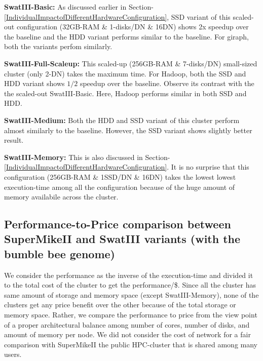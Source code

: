 \documentclass[conference]{IEEEtran}
\begin{document}
\begin{inparaenum}[\itshape 1\upshape)]
\item \textbf{SwatIII-Basic:} As discussed earlier in Section-\ref{IndividualImpactofDifferentHardwareConfiguration}, SSD variant of this scaled-out configuration (32GB-RAM \& 1-disks/DN \& 16DN) shows 2x speedup over the baseline and the HDD variant performs similar to the baseline. For giraph, both the variants perfom similarly.
\item \textbf{SwatIII-Full-Scaleup:} This scaled-up (256GB-RAM \& 7-disks/DN) small-sized cluster (only 2-DN) takes the maximum time. For Hadoop, both the SSD and HDD variant shows $1/2$ speedup over the baseline. Observe its contrast with the the scaled-out SwatIII-Basic. Here, Hadoop performs similar in both SSD and HDD.  
\item \textbf{SwatIII-Medium:} Both the HDD and SSD variant of this cluster perform almost similarly to the baseline. However, the SSD variant shows slightly better result. 
\item \textbf{SwatIII-Memory:} This is also discussed in Section-\ref{IndividualImpactofDifferentHardwareConfiguration}. 
It is no surprise that this configuration (256GB-RAM \& 1SSD/DN \& 16DN) takes the lowest lowest execution-time among all the configuration because of the huge amount of memory availabile across the cluster.
\end{inparaenum}

\subsection {Performance-to-Price comparison between SuperMikeII and SwatIII variants (with the bumble bee genome)} \label{PriceToPerformanceBumbleBee}
We consider the performance as the inverse of the execution-time and divided it to the total cost of the cluster to get the performance/\$.
Since all the cluster has same amount of storage and memory space (except SwatIII-Memory), none of the clusters get any price benefit over the other because of the total storage or memory space.   
Rather, we compare the performance to price from the view point of a proper architectural balance among number of cores, number of disks, and amount of memory per node.
We did not consider the cost of network for a fair comparison with SuperMikeII the public HPC-cluster that is shared among many users.
\end{document}
